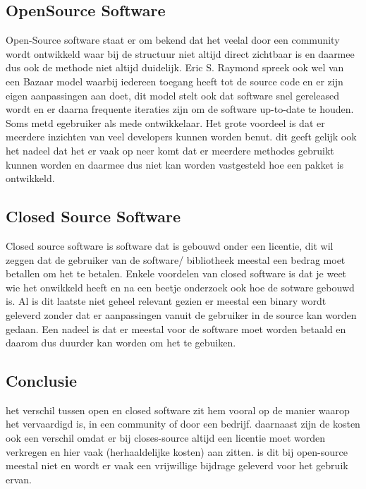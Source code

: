 \subsection{OpenSource Software}Open-Source software staat er om bekend dat het veelal door een community wordt ontwikkeld waar bij de structuur niet altijd direct zichtbaar is en daarmee dus ook de methode niet altijd duidelijk.  	Eric S. Raymond spreek ook wel van een Bazaar model %
waarbij iedereen toegang heeft tot de source code en er zijn eigen aanpassingen aan doet, dit model stelt ook dat software snel gereleased wordt en er daarna frequente iteraties zijn om de software up-to-date te houden. Soms metd egebruiker als mede ontwikkelaar. Het grote voordeel is dat er meerdere inzichten van veel developers kunnen worden benut. dit geeft gelijk ook het nadeel dat het er vaak op neer komt dat er meerdere methodes gebruikt kunnen worden en daarmee dus niet kan worden vastgesteld hoe een pakket is ontwikkeld.

\subsection{Closed Source Software}%
Closed source software is software dat is gebouwd onder een licentie, dit wil zeggen dat de gebruiker van de software/ bibliotheek meestal een bedrag moet betallen om het te betalen. Enkele voordelen van closed software is dat je weet wie het onwikkeld heeft en na een beetje onderzoek ook hoe de sotware gebouwd is. Al is dit laatste niet geheel relevant gezien er meestal een binary wordt geleverd zonder dat er aanpassingen vanuit de gebruiker in de source kan worden gedaan. Een nadeel is dat er meestal voor de software moet worden betaald en daarom dus duurder kan worden om het te gebuiken.

\subsection{Conclusie}

het verschil tussen open en closed software zit hem vooral op de manier waarop het vervaardigd is, in een community of door een bedrijf. daarnaast zijn de kosten ook een verschil omdat er bij closes-source altijd een licentie moet worden verkregen en hier vaak (herhaaldelijke kosten) aan zitten. is dit bij open-source meestal
niet en wordt er vaak een vrijwillige bijdrage geleverd voor het gebruik ervan.

